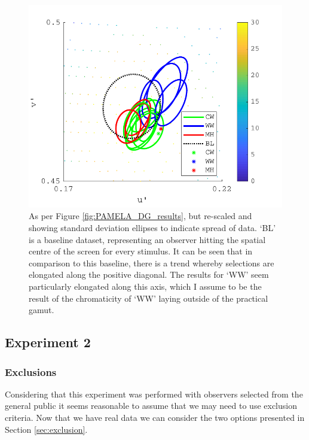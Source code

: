 \begin{figure}[hbtp] %
\includegraphics[max width=\textwidth]{figs/tablet/PAMELA_DG_results_ellipses.pdf} 
\caption{As per Figure \ref{fig:PAMELA_DG_results}, but re-scaled and showing standard deviation ellipses to indicate spread of data. `BL' is a baseline dataset, representing an observer hitting the spatial centre of the screen for every stimulus. It can be seen that in comparison to this baseline, there is a trend whereby selections are elongated along the positive diagonal. The results for `WW' seem particularly elongated along this axis, which I assume to be the result of the chromaticity of `WW' laying outside of the practical gamut.}
\label{fig:PAMELA_DG_results_ellipses}
\end{figure}


\clearpage

\subsection{Experiment 2}

\subsubsection{Exclusions}

Considering that this experiment was performed with observers selected from the general public it seems reasonable to assume that we may need to use exclusion criteria. Now that we have real data we can consider the two options presented in Section \ref{sec:exclusion}.

